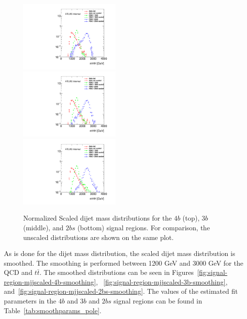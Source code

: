 \begin{figure}[htbp!]
\begin{center}
\includegraphics[width=0.45\textwidth,angle=-90]{figures/boosted/Other/FourTag_Signal_compare_scale_mHH_1.pdf}\\
\includegraphics[width=0.45\textwidth,angle=-90]{figures/boosted/Other/ThreeTag_Signal_compare_scale_mHH_1.pdf}\\
\includegraphics[width=0.45\textwidth,angle=-90]{figures/boosted/Other/TwoTag_split_Signal_compare_scale_mHH_1.pdf}
\caption{Normalized Scaled dijet mass distributions for the $4b$ (top), $3b$ (middle), and $2bs$ (bottom) signal regions.  For comparison, the unscaled distributions are shown on the same plot. }
\label{fig:signal-region-bkg-scaled}
\end{center}
\end{figure}

As is done for the dijet mass distribution,  the scaled dijet mass distribution is smoothed. The smoothing is performed between 1200 GeV and 3000 GeV for the QCD  and $t\bar{t}$. The smoothed distributions can be seen in Figures~\ref{fig:signal-region-mjjscaled-4b-smoothing}, ~\ref{fig:signal-region-mjjscaled-3b-smoothing}, and~\ref{fig:signal-region-mjjscaled-2bs-smoothing}. The values of the estimated fit parameters in the $4b$ and $3b$ and $2bs$ signal regions can be found in Table~\ref{tab:smoothparams_pole}.

